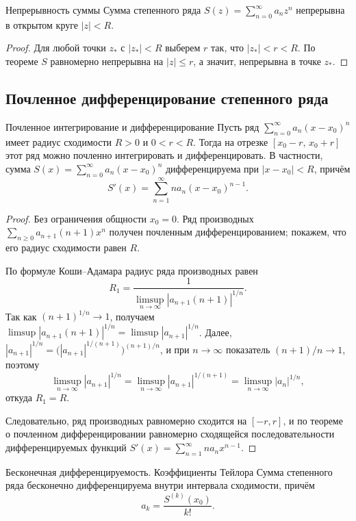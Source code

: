 \begin{Corollary}{Непрерывность суммы}{}
	Сумма степенного ряда $S(z)=\sum_{n=0}^{\infty}a_nz^n$ непрерывна в открытом круге $|z|<R$.
\end{Corollary}

\begin{proof}
	Для любой точки $z_*$ с $|z_*|<R$ выберем $r$ так, что $|z_*|<r<R$.
	По теореме $S$ равномерно непрерывна на $|z|\le r$, а значит, непрерывна в точке $z_*$.
\end{proof}

\subsection{Почленное дифференцирование степенного ряда}

\begin{Theorem}{Почленное интегрирование и дифференцирование}{}
	Пусть ряд $\sum_{n=0}^{\infty}a_n(x-x_0)^n$ имеет радиус сходимости $R>0$
	и $0<r<R$. Тогда на отрезке $[x_0-r,\,x_0+r]$ этот ряд можно почленно интегрировать
	и дифференцировать. В частности, сумма $S(x)=\sum_{n=0}^{\infty}a_n(x-x_0)^n$
	дифференцируема при $|x-x_0|<R$, причём
	\[
	S'(x)=\sum_{n=1}^{\infty}n a_n(x-x_0)^{n-1}.
	\]
\end{Theorem}

\begin{proof}
	Без ограничения общности $x_0=0$. Ряд производных $\sum_{n\ge0}a_{n+1}(n+1)x^n$
	получен почленным дифференцированием; покажем, что его радиус сходимости равен $R$.
	
	По формуле Коши--Адамара радиус ряда производных равен
	\[
	R_1=\frac{1}{\limsup_{n\to\infty}|a_{n+1}(n+1)|^{1/n}}.
	\]
	Так как $(n+1)^{1/n}\to1$, получаем
	$\limsup|a_{n+1}(n+1)|^{1/n}=\limsup|a_{n+1}|^{1/n}$.
	Далее, $|a_{n+1}|^{1/n}=\bigl(|a_{n+1}|^{1/(n+1)}\bigr)^{(n+1)/n}$, и при $n\to\infty$
	показатель $(n+1)/n\to1$, поэтому
	\[
	\limsup_{n\to\infty}|a_{n+1}|^{1/n}=\limsup_{n\to\infty}|a_{n+1}|^{1/(n+1)}=\limsup_{n\to\infty}|a_n|^{1/n},
	\]
	откуда $R_1=R$.
	
	Следовательно, ряд производных равномерно сходится на $[-r,r]$, и по теореме о почленном
	дифференцировании равномерно сходящейся последовательности дифференцируемых функций
	$S'(x)=\sum_{n=1}^\infty na_nx^{n-1}$.
\end{proof}

\begin{Corollary}{Бесконечная дифференцируемость. Коэффициенты Тейлора}{}
	Сумма степенного ряда бесконечно дифференцируема внутри интервала сходимости, причём
	\[
	a_k=\frac{S^{(k)}(x_0)}{k!}.
	\]
\end{Corollary}

